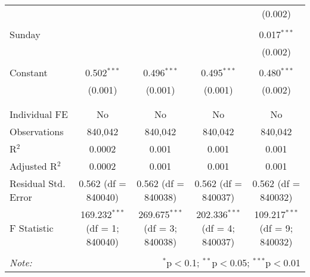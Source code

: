 \documentclass[
]{article}
\begin{document}
\begin{table}[!htbp]
{\begin{tabular}{@{\extracolsep{5pt}}lcccc}
  &  &  &  & (0.002) \\ 
  & & & & \\ 
 Sunday &  &  &  & 0.017$^{***}$ \\ 
  &  &  &  & (0.002) \\ 
  & & & & \\ 
 Constant & 0.502$^{***}$ & 0.496$^{***}$ & 0.495$^{***}$ & 0.480$^{***}$ \\ 
  & (0.001) & (0.001) & (0.001) & (0.002) \\ 
  & & & & \\ 
\hline \\[-1.8ex] 
Individual FE & No & No & No & No \\ 
Observations & 840,042 & 840,042 & 840,042 & 840,042 \\ 
R$^{2}$ & 0.0002 & 0.001 & 0.001 & 0.001 \\ 
Adjusted R$^{2}$ & 0.0002 & 0.001 & 0.001 & 0.001 \\ 
Residual Std. Error & 0.562 (df = 840040) & 0.562 (df = 840038) & 0.562 (df = 840037) & 0.562 (df = 840032) \\ 
F Statistic & 169.232$^{***}$ (df = 1; 840040) & 269.675$^{***}$ (df = 3; 840038) & 202.336$^{***}$ (df = 4; 840037) & 109.217$^{***}$ (df = 9; 840032) \\ 
\hline 
\hline \\[-1.8ex] 
\textit{Note:}  & \multicolumn{4}{r}{$^{*}$p$<$0.1; $^{**}$p$<$0.05; $^{***}$p$<$0.01} \\ 
\end{tabular}
} 
\end{table} 
\newpage
\end{document}
